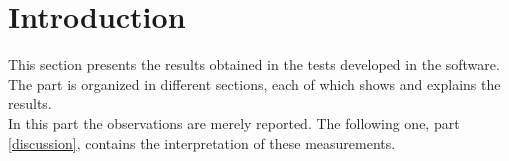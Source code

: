 \chapter{Introduction}

This section presents the results obtained in the tests developed in the software. The part is organized in different sections, each of which shows and explains the results. 
\\

In this part the observations are merely reported. The following one, part \ref{discussion}, contains the interpretation of these measurements. 